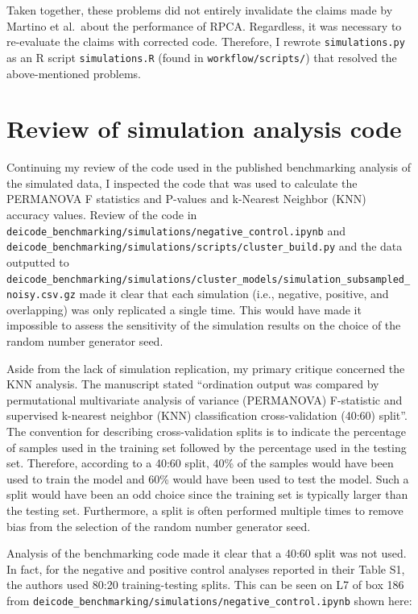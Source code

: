 \documentclass[
]{article}
\begin{document}
Taken together, these problems did not entirely invalidate the claims
made by Martino et al.~about the performance of RPCA. Regardless, it was
necessary to re-evaluate the claims with corrected code. Therefore, I
rewrote \texttt{simulations.py} as an R script \texttt{simulations.R}
(found in \texttt{workflow/scripts/}) that resolved the above-mentioned
problems.

\section{Review of simulation analysis
code}\label{review-of-simulation-analysis-code}

Continuing my review of the code used in the published benchmarking
analysis of the simulated data, I inspected the code that was used to
calculate the PERMANOVA F statistics and P-values and k-Nearest Neighbor
(KNN) accuracy values. Review of the code in
\texttt{deicode\_benchmarking/simulations/negative\_control.ipynb} and
\texttt{deicode\_benchmarking/simulations/scripts/cluster\_build.py} and
the data outputted to
\texttt{deicode\_benchmarking/simulations/cluster\_models/simulation\_subsampled\_noisy.csv.gz}
made it clear that each simulation (i.e., negative, positive, and
overlapping) was only replicated a single time. This would have made it
impossible to assess the sensitivity of the simulation results on the
choice of the random number generator seed.

Aside from the lack of simulation replication, my primary critique
concerned the KNN analysis. The manuscript stated ``ordination output
was compared by permutational multivariate analysis of variance
(PERMANOVA) F-statistic and supervised k-nearest neighbor (KNN)
classification cross-validation (40:60) split''. The convention for
describing cross-validation splits is to indicate the percentage of
samples used in the training set followed by the percentage used in the
testing set. Therefore, according to a 40:60 split, 40\% of the samples
would have been used to train the model and 60\% would have been used to
test the model. Such a split would have been an odd choice since the
training set is typically larger than the testing set. Furthermore, a
split is often performed multiple times to remove bias from the
selection of the random number generator seed.

Analysis of the benchmarking code made it clear that a 40:60 split was
not used. In fact, for the negative and positive control analyses
reported in their Table S1, the authors used 80:20 training-testing
splits. This can be seen on L7 of box 186 from
\texttt{deicode\_benchmarking/simulations/negative\_control.ipynb} shown
here:
\end{document}
